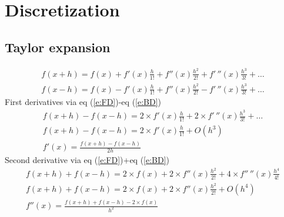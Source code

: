 \documentclass[11pt,dvips]{article}
\numberwithin{equation}{section}
\begin{document}
\section{Discretization}
\subsection{Taylor expansion}
%
\begin{gather}
f(x+h)=f(x)+f'(x)\frac{h}{1!}+f''(x)\frac{h^2}{2!}+f'\,''(x)\frac{h^3}{3!}+ \ldots  \label{e:FD} \\
f(x-h)=f(x)-f'(x)\frac{h}{1!}+f''(x)\frac{h^2}{2!}-f'\,''(x)\frac{h^3}{3!}+ \ldots  \label{e:BD} 
\end{gather}
%
First derivatives via eq (\ref{e:FD})-eq (\ref{e:BD})
%
\begin{gather}
f(x+h)-f(x-h)=2\times f'(x)\frac{h}{1!}+2 \times f'\,''(x)\frac{h^3}{3!}+ \ldots \nonumber \\
f(x+h)-f(x-h)=2\times f'(x)\frac{h}{1!}+O(h^3) \nonumber \\
f'(x)=\frac{f(x+h)-f(x-h)}{2h}  \label{e:f_1d}
\end{gather}
%
Second derivative via eq (\ref{e:FD})+eq (\ref{e:BD})
%
\begin{gather}
f(x+h)+f(x-h)=2\times f(x)+2 \times f''(x)\frac{h^2}{2!}+4 \times f''\,''(x)
\frac{h^4}{4!} \nonumber \\
f(x+h)+f(x-h)=2\times f(x)+2 \times f''(x)\frac{h^2}{2!}+O(h^4) \nonumber \\
f''(x)=\frac{f(x+h)+f(x-h)-2\times f(x)}{h^2} \label{e:f_2d}
\end{gather}
%
\end{document}
